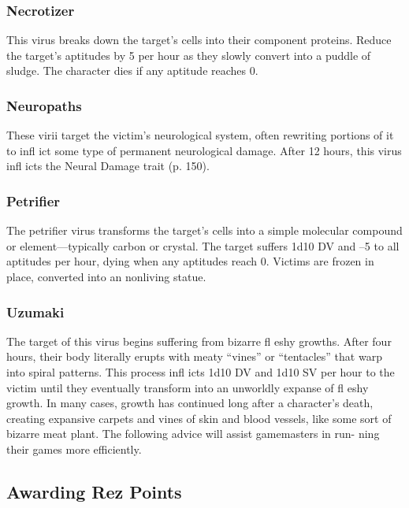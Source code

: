 \subsubsection{Necrotizer}

This virus breaks down the target's cells into their 
component proteins. Reduce the target's aptitudes by 
5 per hour as they slowly convert into a puddle of 
sludge. The character dies if any aptitude reaches 0.

\subsubsection{Neuropaths}

These virii target the victim's neurological system, 
often rewriting portions of it to infl ict some type of 
permanent neurological damage. After 12 hours, this 
virus infl icts the Neural Damage trait (p. 150).

\subsubsection{Petrifier}

The petrifier virus transforms the target's cells into 
a simple molecular compound or element—typically 
carbon or crystal. The target suffers 1d10 DV and –5 
to all aptitudes per hour, dying when any aptitudes 
reach 0. Victims are frozen in place, converted into an 
nonliving statue.

\subsubsection{Uzumaki}

The target of this virus begins suffering from bizarre 
fl eshy growths. After four hours, their body literally 
erupts with meaty ``vines'' or ``tentacles'' that warp 
into spiral patterns. This process infl icts 1d10 DV and 
1d10 SV per hour to the victim until they eventually 
transform into an unworldly expanse of fl eshy growth. 
In many cases, growth has continued long after a 
character's death, creating expansive carpets and vines 
of skin and blood vessels, like some sort of bizarre 
meat plant.
The following advice will assist gamemasters in run-
ning their games more efficiently.

\subsection{Awarding Rez Points }

